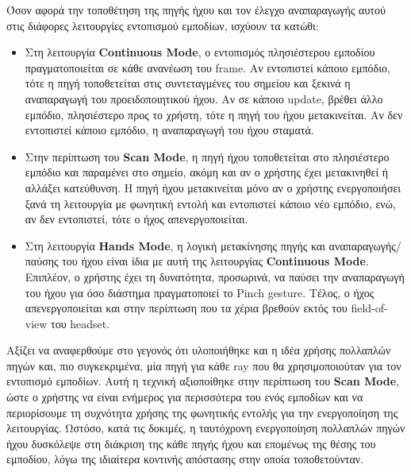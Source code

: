 Όσον αφορά την τοποθέτηση της πηγής ήχου και τον έλεγχο αναπαραγωγής αυτού στις διάφορες λειτουργίες εντοπισμού εμποδίων, ισχύουν τα κατώθι:
\begin{itemize}
    \item Στη λειτουργία \textbf{Continuous Mode}, ο εντοπισμός πλησιέστερου εμποδίου πραγματοποιείται σε κάθε ανανέωση του frame. Αν εντοπιστεί κάποιο εμπόδιο, τότε η πηγή τοποθετείται στις συντεταγμένες του σημείου και ξεκινά η αναπαραγωγή του προειδοποιητικού ήχου. Αν σε κάποιο update, βρέθει άλλο εμπόδιο, πλησιέστερο προς το χρήστη, τότε η πηγή του ήχου μετακινείται. Αν δεν εντοπιστεί κάποιο εμπόδιο, η αναπαραγωγή του ήχου σταματά.
    \item Στην περίπτωση του \textbf{Scan Mode}, η πηγή ήχου τοποθετείται στο πλησιέστερο εμπόδιο και παραμένει στο σημείο, ακόμη και αν ο χρήστης έχει μετακινηθεί ή αλλάξει κατεύθυνση. Η πηγή ήχου μετακινείται μόνο αν ο χρήστης ενεργοποιήσει ξανά τη λειτουργία με φωνητική εντολή και εντοπιστεί κάποιο νέο εμπόδιο, ενώ, αν δεν εντοπιστεί, τότε ο ήχος απενεργοποιείται.
    \item Στη λειτουργία \textbf{Hands Mode}, η λογική μετακίνησης πηγής και αναπαραγωγής/παύσης του ήχου είναι ίδια με αυτή της λειτουργίας \textbf{Continuous Mode}. Επιπλέον, ο χρήστης έχει τη δυνατότητα, προσωρινά, να παύσει την αναπαραγωγή του ήχου για όσο διάστημα πραγματοποιεί το Pinch gesture. Τέλος, ο ήχος απενεργοποιείται και στην περίπτωση που τα χέρια βρεθούν εκτός του field-of-view του headset.
\end{itemize}

Αξίζει να αναφερθούμε στο γεγονός ότι υλοποιήθηκε και η ιδέα χρήσης πολλαπλών πηγών και, πιο συγκεκριμένα, μία πηγή για κάθε ray που θα χρησιμοποιούταν για τον εντοπισμό εμποδίων. Αυτή η τεχνική αξιοποίθηκε στην περίπτωση του \textbf{Scan Mode}, ώστε ο χρήστης να είναι ενήμερος για περισσότερα του ενός εμποδίων και να περιορίσουμε τη συχνότητα χρήσης της φωνητικής εντολής για την ενεργοποίηση της λειτουργίας. Ωστόσο, κατά τις δοκιμές, η ταυτόχρονη ενεργοποίηση πολλαπλών πηγών ήχου δυσκόλεψε στη διάκριση της κάθε πηγής ήχου και επομένως της θέσης του εμποδίου, λόγω της ιδιαίτερα κοντινής απόστασης στην οποία τοποθετούνταν.

